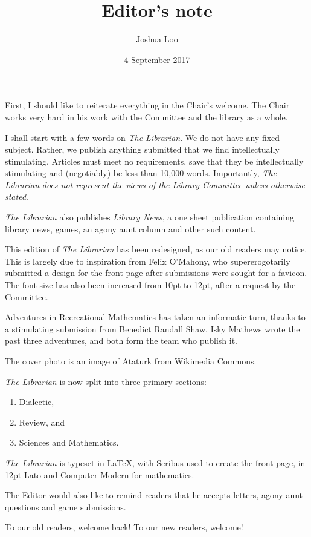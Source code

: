 \documentclass[10pt,a4paper]{article}
\newcounter{count}
\begin{document}
\setcounter{section}{-1}

\title{Editor's note}
\date{4 September 2017}
\author{Joshua Loo}

\maketitle

\begin{multicols}{2}
	
	First, I should like to reiterate everything in the Chair's welcome. The Chair works very hard in his work with the Committee and the library as a whole.
	
	I shall start with a few words on \textit{The Librarian}. We do not have any fixed subject. Rather, we publish anything submitted that we find intellectually stimulating. Articles must meet no requirements, save that they be intellectually stimulating and (negotiably) be less than 10,000 words. Importantly, \textit{The Librarian} \textit{does not represent the views of the Library Committee unless otherwise stated}.
	
	\textit{The Librarian} also publishes \textit{Library News}, a one sheet publication containing library news, games, an agony aunt column and other such content.
	
	This edition of \textit{The Librarian} has been redesigned, as our old readers may notice. This is largely due to inspiration from Felix O'Mahony, who supererogotarily submitted a design for the front page after submissions were sought for a favicon. The font size has also been increased from 10pt to 12pt, after a request by the Committee.
	
	Adventures in Recreational Mathematics has taken an informatic turn, thanks to a stimulating submission from Benedict Randall Shaw. Isky Mathews wrote the past three adventures, and both form the team who publish it.
	
	The cover photo is an image of Ataturk from Wikimedia Commons.
	
	\textit{The Librarian} is now split into three primary sections:
	\begin{enumerate}
		\item Dialectic,
		\item Review, and
		\item Sciences and Mathematics.
	\end{enumerate}
	
	\textit{The Librarian} is typeset in \LaTeX, with Scribus used to create the front page, in 12pt Lato and Computer Modern for mathematics.
	
	The Editor would also like to remind readers that he accepts letters, agony aunt questions and game submissions.
	
	To our old readers, welcome back! To our new readers, welcome!
	
\end{multicols}
\end{document}

